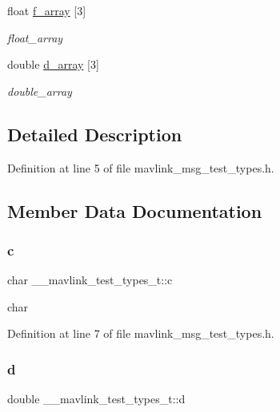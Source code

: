 \begin{DoxyCompactItemize}
float \mbox{\hyperlink{struct____mavlink__test__types__t_a68b419edbba3363825518ccf81482f85}{f\+\_\+array}} \mbox{[}3\mbox{]}
\begin{DoxyCompactList}\small\item\em float\+\_\+array \end{DoxyCompactList}\item 
double \mbox{\hyperlink{struct____mavlink__test__types__t_a21df24e69478562cbd26e9a954dbb403}{d\+\_\+array}} \mbox{[}3\mbox{]}
\begin{DoxyCompactList}\small\item\em double\+\_\+array \end{DoxyCompactList}\end{DoxyCompactItemize}


\subsection{Detailed Description}


Definition at line 5 of file mavlink\+\_\+msg\+\_\+test\+\_\+types.\+h.



\subsection{Member Data Documentation}
\mbox{\label{struct____mavlink__test__types__t_aa40c20757144c710972466c624337241}} 
\subsubsection{\texorpdfstring{c}{c}}
{\footnotesize\ttfamily char \+\_\+\+\_\+mavlink\+\_\+test\+\_\+types\+\_\+t\+::c}



char 



Definition at line 7 of file mavlink\+\_\+msg\+\_\+test\+\_\+types.\+h.

\mbox{\label{struct____mavlink__test__types__t_a12ac797d1a0b3e329000fe19bcafb992}} 
\subsubsection{\texorpdfstring{d}{d}}
{\footnotesize\ttfamily double \+\_\+\+\_\+mavlink\+\_\+test\+\_\+types\+\_\+t\+::d}



